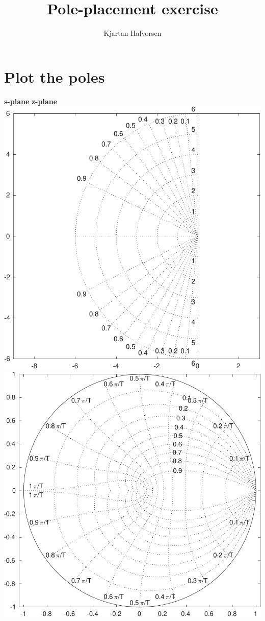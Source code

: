 \documentclass[letterpaper,fleqn]{scrartcl}
\author{Kjartan Halvorsen}
\date{}
\title{Pole-placement exercise}
\begin{document}
\maketitle

\section*{Plot the poles}
\label{sec-1}
\begin{center}
\textbf{s-plane} \hspace*{0.4\linewidth} \textbf{z-plane}\\
\includegraphics[height=0.34\textheight]{../../figures/sgrid-crop} \hspace*{3mm}
\includegraphics[height=0.34\textheight]{../../figures/zgrid-crop}\\
\end{center}
\end{document}
